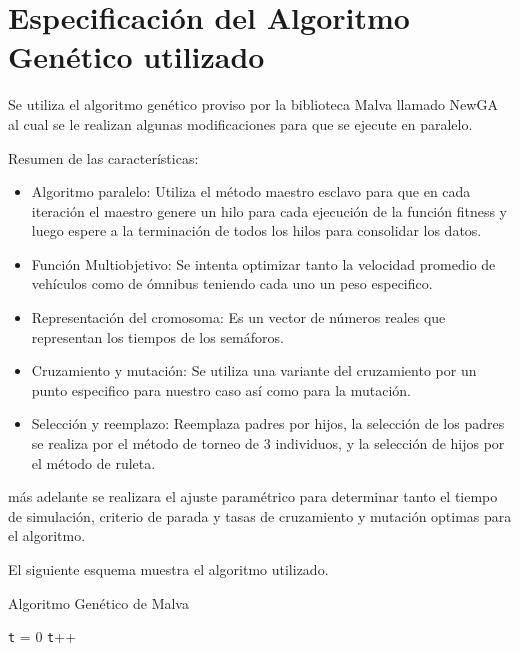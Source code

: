 \newpage

\section{Especificación del Algoritmo Genético utilizado}
Se utiliza el algoritmo genético proviso por la biblioteca  Malva  llamado NewGA al cual se le realizan algunas modificaciones para que se ejecute en paralelo.


Resumen de las características:
\begin{itemize}

\item Algoritmo paralelo: Utiliza el método maestro esclavo para que en cada iteración el maestro genere un hilo para cada ejecución  de la función fitness y luego espere a la terminación de todos los hilos para consolidar los datos. 
\item Función Multiobjetivo: Se intenta optimizar tanto la velocidad promedio de vehículos como de ómnibus teniendo cada uno un peso especifico.
\item Representación del cromosoma: Es un vector de números reales que representan los tiempos de los semáforos.
\item Cruzamiento y mutación: Se utiliza una variante del cruzamiento por un punto especifico para nuestro caso así como para la mutación.
\item Selección y reemplazo: Reemplaza padres por hijos, la selección de los padres se realiza por el método de torneo de 3 individuos, y la selección de hijos por el método de ruleta.

\end{itemize}

más adelante se realizara el ajuste paramétrico para determinar tanto el tiempo de simulación, criterio de parada y tasas de cruzamiento y mutación optimas para el algoritmo.

El siguiente esquema muestra el algoritmo utilizado. \citep{MalvaAlgGenetico}

 
\begin{algorithm}[H]
	\caption{Algoritmo Genético de Malva}
	\label{alg:algoritmo_genetico_malva}
	\begin{algorithmic} [1] 
		{
			\STATE \texttt{t} = 0
			\STATE \texttt{t}++		
			\ENDWHILE
		}
	\end{algorithmic}

\end{algorithm}




